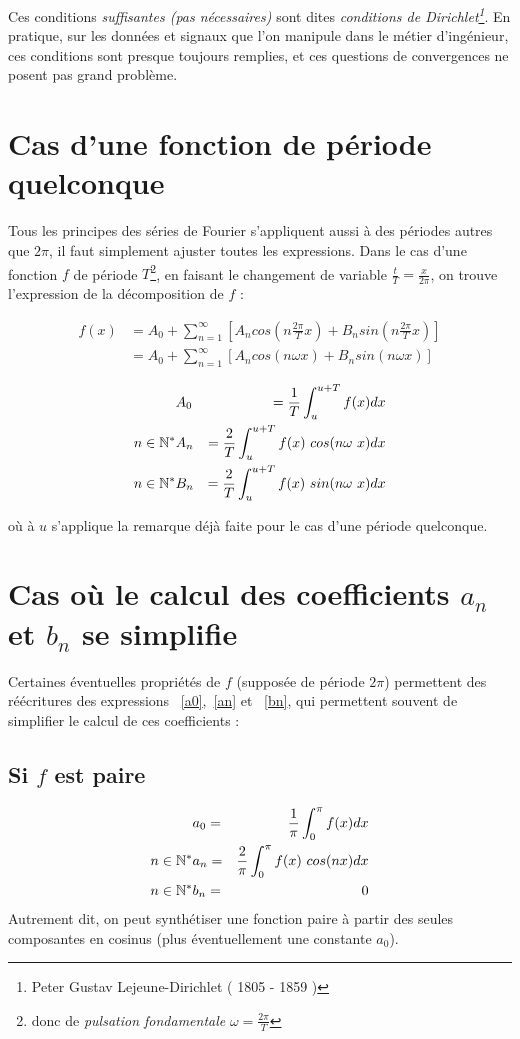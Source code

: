 Ces conditions \emph{suffisantes (pas nécessaires)} sont dites
\emph{conditions de Dirichlet\footnote{Peter Gustav Lejeune-Dirichlet
  ( 1805 - 1859 )}}. En pratique, sur les données et
signaux que l'on manipule dans le métier d'ingénieur, ces conditions
sont presque toujours remplies, et ces questions de convergences ne
posent pas grand problème.


\section{Cas d'une fonction de période quelconque}
Tous les principes des séries de Fourier s'appliquent aussi à des périodes
autres que $2\pi$, il faut simplement ajuster
toutes les expressions. Dans le cas d'une fonction $f$ de période
$T$\footnote{donc de \emph{pulsation fondamentale}
  $\omega=\frac{2\pi}{T}$}, en faisant le changement de variable
$\frac{t}{T}=\frac{x}{2\pi}$, on trouve l'expression de la décomposition de $f$ :

\begin{eqnarray}
f(x) & = A_0+\sum_{n=1}^{\infty}[A_n cos(n\frac{2\pi}{T}x) + B_n sin(n\frac{2\pi}{T}x)] \\
     & = A_0+\sum_{n=1}^{\infty}[A_n cos(n\omega x) + B_n sin(n\omega x)] 
\end{eqnarray}

\begin{eqnarray}
& A_0 & =\frac{1}{T}\int_{u}^{u+T}f(x)dx \label{a0T}\\
n\in \NN^* & A_n & =\frac{2}{T}\int_{u}^{u+T}f(x)\ cos(n\omega~x) dx  \label{anT}\\
n\in \NN^* & B_n & =\frac{2}{T}\int_{u}^{u+T}f(x)\ sin(n\omega~x) dx  \label{bnT}
\end{eqnarray}

où à $u$ s'applique la remarque déjà faite pour le cas d'une période quelconque.

\section{Cas où le calcul des coefficients \texorpdfstring{$a_n$}{a\subscriptn} et \texorpdfstring{$b_n$}{b\subscriptn} se simplifie}

Certaines éventuelles propriétés de $f$ (supposée de période $2\pi$) 
permettent des réécritures des expressions ~\ref{a0},~\ref{an} et
~\ref{bn}, qui permettent souvent de simplifier le calcul de ces coefficients :
\subsection{Si \texorpdfstring{$f$}{f} est paire}
\begin{eqnarray}
& a_0=&\frac{1}{\pi}\int_{0}^{\pi}f(x)dx \label{a0paire}\\
n\in \mathbb{N}^* & a_n=&\frac{2}{\pi}\int_{0}^{\pi}f(x)\ cos(nx) dx  \label{anpaire}\\
n\in \mathbb{N}^* & b_n=&0  \label{bnpaire}
\end{eqnarray}
Autrement dit, on peut synthétiser une fonction paire à partir des
seules composantes en cosinus (plus éventuellement une constante $a_0$).
